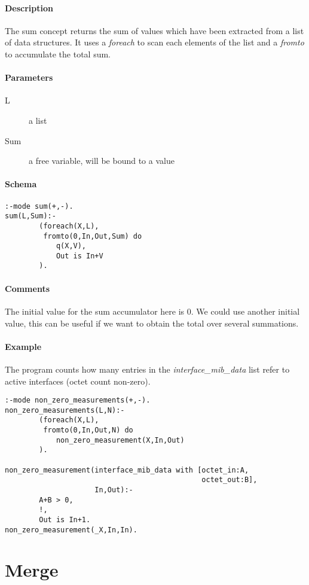 \documentclass[a4paper,12pt]{report}
\begin{document}
\paragraph{Description}
The sum concept returns the sum of values which have been extracted from a list of data structures. It uses a {\it foreach} to scan each elements of the list and a {\it fromto} to accumulate the total sum.
\paragraph{Parameters}
\begin{description}
\item[L] a list
\item[Sum] a free variable, will be bound to a value
\end{description}
\paragraph{Schema}
\begin{verbatim}
:-mode sum(+,-).
sum(L,Sum):-
        (foreach(X,L),
         fromto(0,In,Out,Sum) do
            q(X,V),
            Out is In+V
        ).
\end{verbatim}
\paragraph{Comments}
The initial value for the sum accumulator here is 0. We could use another initial value, this can be useful if we want to obtain the total over several summations. 
\pagebreak
\paragraph{Example}
The program counts how many entries in the {\it interface\_mib\_data} list refer to active interfaces (octet count non-zero).
\begin{verbatim}
:-mode non_zero_measurements(+,-).
non_zero_measurements(L,N):-
        (foreach(X,L),
         fromto(0,In,Out,N) do
            non_zero_measurement(X,In,Out)
        ).

non_zero_measurement(interface_mib_data with [octet_in:A,
                                              octet_out:B],
                     In,Out):-
        A+B > 0,
        !,
        Out is In+1.
non_zero_measurement(_X,In,In).
\end{verbatim}
\pagebreak
\section{Merge}
\end{document}
